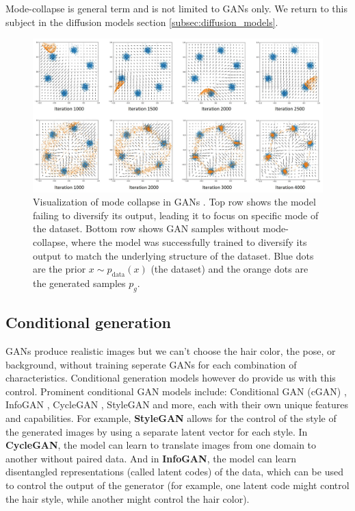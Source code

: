Mode-collapse is general term and is not limited to GANs only. We return to this subject in the diffusion models section \ref{subsec:diffusion_models}.

\begin{figure}
    \centering
    \includegraphics[width=\textwidth]{images/gan/gan_mode_collapse.png}
    \caption{Visualization of mode collapse in GANs \cite{gan_mode_collapse_image_source}. Top row shows the model failing to diversify its output, leading it to focus on specific mode of the dataset. Bottom row shows GAN samples without mode-collapse, where the model was successfully trained to diversify its output to match the underlying structure of the dataset. Blue dots are the prior $x \sim p_{\text{data}}(x)$ (the dataset) and the orange dots are the generated samples $p_g$.}
    \label{fig:gan_mode_collapse}
\end{figure}




\subsection{Conditional generation}
\label{subsec:gan_conditional_generation}

GANs produce realistic images but we can't choose the hair color, the pose, or background, without training seperate GANs for each combination of characteristics. Conditional generation models however do provide us with this control. Prominent conditional GAN models include: Conditional GAN (cGAN) \cite{cgan}, InfoGAN \cite{infogan}, CycleGAN \cite{cyclegan}, StyleGAN \cite{stylegan} and more, each with their own unique features and capabilities. For example, \textbf{StyleGAN} allows for the control of the style of the generated images by using a separate latent vector for each style. In \textbf{CycleGAN}, the model can learn to translate images from one domain to another without paired data. And in \textbf{InfoGAN}, the model can learn disentangled representations (called latent codes) of the data, which can be used to control the output of the generator (for example, one latent code might control the hair style, while another might control the hair color).

